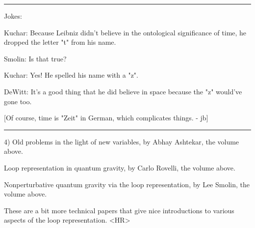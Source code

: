 \par\noindent\rule{\textwidth}{0.4pt}

Jokes:

Kuchar: Because Leibniz didn't believe in the ontological
significance of time, he dropped the letter "t" from his name.

Smolin: Is that true?

Kuchar: Yes!  He spelled his name with a "z".

DeWitt: It's a good thing that he did believe in space because
the "z" would've gone too.

[Of course, time is "Zeit" in German, which complicates things. - jb]


\par\noindent\rule{\textwidth}{0.4pt}

4) Old problems in the light of new variables, by Abhay Ashtekar,
the volume above.

Loop representation in quantum gravity, by Carlo Rovelli, the
volume above.

Nonperturbative quantum gravity via the loop representation, by
Lee Smolin, the volume above.


These are a bit more technical papers that give nice
introductions to various aspects of the loop representation.
<HR>



